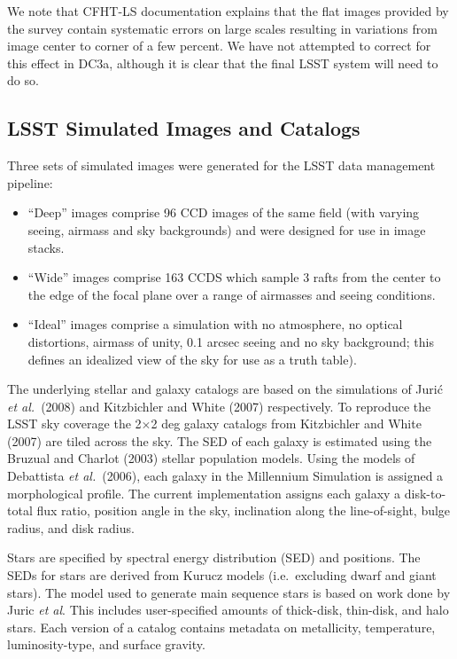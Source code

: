 We note that CFHT-LS documentation explains that the flat images
provided by the survey contain systematic errors on large scales
resulting in variations from image center to corner of a few percent.
We have not attempted to correct for this effect in DC3a,  although it
is clear that the final LSST system will need to do so.

\subsection{LSST Simulated Images and Catalogs}

Three sets of simulated images were generated for the LSST data
management pipeline: 

\begin{itemize}
\item ``Deep'' images comprise 96 CCD images of the
same field (with varying seeing, airmass and sky backgrounds) and were
designed for use in image stacks.
\item ``Wide'' images comprise 163 CCDS
which sample 3 rafts from the center to the edge of the focal plane
over a range of airmasses and seeing conditions.
\item ``Ideal'' images
comprise a simulation with no atmosphere, no optical distortions,
airmass of unity, 0.1 arcsec seeing and no sky background; this
defines an idealized view of the sky for use as a truth table).
\end{itemize}

The underlying stellar and galaxy catalogs are based on the
simulations of Juri\'c {\it et al.}~(2008) and Kitzbichler and White
(2007) respectively.  To reproduce the LSST sky coverage the 2$\times$2 deg
galaxy catalogs from Kitzbichler and White (2007) are tiled across the
sky.  The SED of each galaxy is estimated using the Bruzual and Charlot
(2003) stellar population models. Using the models of Debattista
\textit{et al.}~(2006), each galaxy in the Millennium Simulation is
assigned a morphological profile. The current implementation assigns
each galaxy a disk-to-total flux ratio, position angle in the sky,
inclination along the line-of-sight, bulge radius, and disk radius.

Stars are specified by spectral energy distribution (SED)
and positions. The SEDs for stars are
derived from Kurucz models (i.e.\ excluding dwarf and giant
stars). The model used to generate main sequence stars is based on
work done by Juric \textit{et al}. This includes user-specified amounts of
thick-disk, thin-disk, and halo stars. Each version of a catalog
contains metadata on metallicity, temperature, luminosity-type, and
surface gravity.

